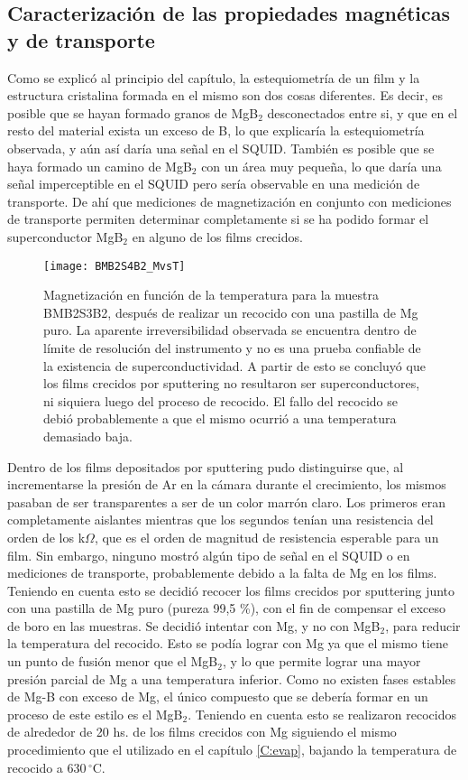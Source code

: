 \subsection{Caracterización de las propiedades magnéticas y de transporte}\label{SS:sptucarac}
Como se explicó al principio del capítulo, la estequiometría de un film y la estructura cristalina formada en el mismo son dos cosas diferentes. Es decir, es posible que se hayan formado granos de MgB$_2$ desconectados entre si, y que en el resto del material exista un exceso de B, lo que explicaría la estequiometría observada, y aún así daría una señal en el SQUID. También es posible que se haya formado un camino de MgB$_2$ con un área muy pequeña, lo que daría una señal imperceptible en el SQUID pero sería observable en una medición de transporte. De ahí que mediciones de magnetización en conjunto con mediciones de transporte permiten determinar completamente si se ha podido formar el superconductor MgB$_2$ en alguno de los films crecidos.
 \begin{figure}[tbh!]
   \begin{center}
	 \texttt{[image: BMB2S4B2\_MvsT]}
   \end{center}
   \caption[Magnetización en función de la temperatura para la muestra BMB2S3B2, después de realizar un recocido con una pastilla de Mg puro.]{Magnetización en función de la temperatura para la muestra BMB2S3B2, después de realizar un recocido con una pastilla de Mg puro. La aparente irreversibilidad observada se encuentra dentro de límite de resolución del instrumento y no es una prueba confiable de la existencia de superconductividad. A partir de esto se concluyó que los films crecidos por sputtering no resultaron ser superconductores, ni siquiera luego del proceso de recocido. El fallo del recocido se debió probablemente a que el mismo ocurrió a una temperatura demasiado baja.}
   \label{fig:mvst}
 \end{figure}
\newpage
 Dentro de los films depositados por sputtering pudo distinguirse que, al incrementarse la presión de Ar en la cámara durante el crecimiento, los mismos pasaban de ser trans\-pa\-ren\-tes a ser de un color marrón claro. Los primeros eran completamente aislantes mientras que los segundos tenían una resistencia del orden de los k$\Omega$, que es el orden de magnitud de resistencia esperable para un film. Sin embargo, ninguno mostró algún tipo de señal en el SQUID o en mediciones de transporte, probablemente debido a la falta de Mg en los films. Teniendo en cuenta esto se decidió recocer los films crecidos por sputtering junto con una pastilla de Mg puro (pureza 99,5 \%), con el fin de compensar el exceso de boro en las muestras. Se decidió intentar con Mg, y no con MgB$_2$, para reducir la temperatura del recocido. Esto se podía lograr con Mg ya que el mismo tiene un punto de fusión menor que el MgB$_2$, y lo que permite lograr una mayor presión parcial de Mg a una temperatura inferior. Como no existen fases estables de Mg-B  con exceso de Mg, el único compuesto que se debería formar en un proceso de este estilo es el MgB$_2$. Teniendo en cuenta esto se realizaron recocidos de alrededor de 20 hs. de los films crecidos con Mg siguiendo el mismo procedimiento que el utilizado en el capítulo \ref{C:evap}, bajando la temperatura de recocido a 630\,$^{\circ}$C.

